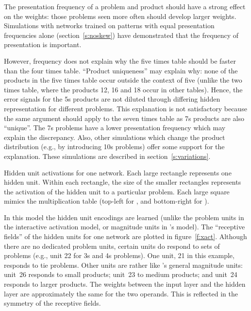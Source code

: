 The presentation frequency of a problem and product should have a strong
effect on the weights: those problems seen more often should develop larger
weights. Simulations with networks trained on patterns with equal
presentation frequencies alone (section~\ref{s:noskew})
have demonstrated that the frequency of
presentation is important.

However, frequency does not explain why the five times table should be
faster than the four times table. ``Product uniqueness'' may explain why:
none of the products in the five times table occur outside the context of
five (unlike the two times table, where the products 12, 16 and 18 occur in
other tables).  Hence, the error signals for the 5s products are not
diluted through differing hidden representation for different problems.
This explanation is not satisfactory because the same argument should apply
to the seven times table as 7s products are also ``unique''.  The 7s
problems have a lower presentation frequency which may explain the
discrepancy. Also, other simulations which change the product distribution
(e.g., by introducing 10s problems) offer some support for the explanation.
 These simulations are described in section~\ref{s:variations}.

\begin{fancyfigure}
\centerline{}
\caption{Hidden unit activations for one network. Each large rectangle
represents one hidden unit.  Within each rectangle, the size of the smaller
rectangles represents
the activation of the hidden unit to a particular problem. Each large
square mimics the multiplication table (top-left for ,
and bottom-right for ).}\label{f:xact}
\end{fancyfigure}


In this model the hidden unit encodings are learned (unlike the problem
units in the interactive activation model, or magnitude units in
\citeauthor{camp85}'s model).  The ``receptive fields'' of the hidden units
for one network are plotted in figure~\ref{f:xact}.  Although there are no
dedicated problem units, certain units do respond to sets of problems
(e.g., unit 22 for 3s and 4s problems).  One unit, 21 in this example,
responds to tie problems.  Other units are rather like
\citeauthor{camp85}'s general magnitude units: unit~26 responds to small
products; unit~23 to medium products; and unit~24 responds to larger
products.  The weights between the input layer and the hidden layer are
approximately the same for the two operands.  This is reflected in the
symmetry of the receptive fields.

